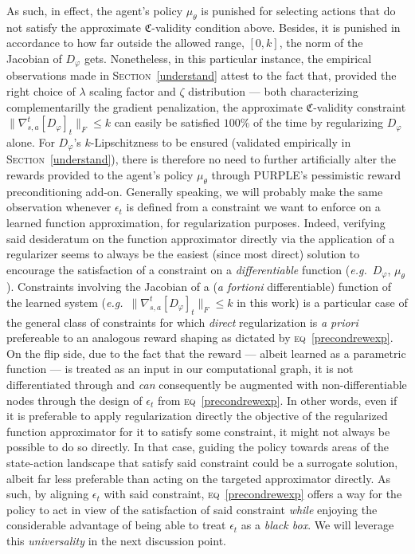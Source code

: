 As such, in effect, the agent's policy $\mu_\theta$ is punished for selecting actions that do not satisfy the
approximate $\mathfrak{C}$-validity condition above.
Besides, it is punished in accordance to how far outside the allowed
range, $[0,k]$, the norm of the Jacobian of $D_\varphi$ gets.
Nonetheless, in this particular instance, the empirical observations made in \textsc{Section}~\ref{understand}
attest to the fact that, provided the right choice of $\lambda$ scaling factor and $\zeta$ distribution
--- both characterizing complementarilly the gradient penalization,
the approximate $\mathfrak{C}$-validity constraint $\lVert \nabla_{s,a}^t[D_\varphi]_t \rVert _F \leq k$
can easily be satisfied $100\%$ of the time by regularizing $D_\varphi$ alone.
For $D_\varphi$'s $k$-Lipschitzness to be ensured (validated empirically in \textsc{Section}~\ref{understand}),
there is therefore no need to further artificially alter the rewards provided to the agent's policy $\mu_\theta$
through PURPLE's pessimistic reward preconditioning add-on.
Generally speaking, we will probably make the same observation whenever $\epsilon_t$ is defined from a constraint
we want to enforce on a learned function approximation, for regularization purposes.
Indeed, verifying said desideratum on the function approximator directly via the application of a regularizer seems
to always be the easiest (since most direct) solution to encourage the satisfaction of a constraint on
a \emph{differentiable} function (\textit{e.g.}~$D_\varphi$, $\mu_\theta$).
Constraints involving the Jacobian of a (\textit{a fortioni} differentiable) function of the learned system
(\textit{e.g.}~$\lVert \nabla_{s,a}^t[D_\varphi]_t \rVert _F \leq k$ in this work)
is a particular case of the general class of constraints for which \emph{direct} regularization is
\textit{a priori} prefereable to an analogous reward shaping as dictated by \textsc{eq}~\ref{precondrewexp}.
On the flip side, due to the fact that the reward --- albeit learned as a parametric function ---
is treated as an input in our computational graph,
it is not differentiated through and \emph{can} consequently
be augmented with non-differentiable nodes through the design of $\epsilon_t$ from \textsc{eq}~\ref{precondrewexp}.
In other words, even if it is preferable to apply regularization directly the objective of the regularized
function approximator for it to satisfy some constraint,
it might not always be possible to do so directly.
In that case, guiding the policy towards areas of the state-action landscape that satisfy said constraint
could be a surrogate solution, albeit far less preferable than acting on the targeted approximator directly.
As such, by aligning $\epsilon_t$ with said constraint, \textsc{eq}~\ref{precondrewexp} offers a way for the policy
to act in view of the satisfaction of said constraint \emph{while} enjoying the considerable advantage
of being able to treat $\epsilon_t$ as a \emph{black box}.
We will leverage this \emph{universality} in the next discussion point.

